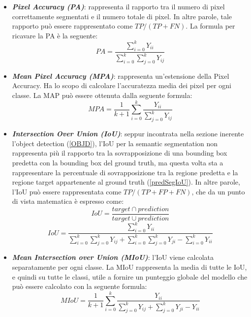 \begin{itemize}
    \item {\bfseries{\emph{Pixel Accuracy (PA)}}}: rappresenta il rapporto tra il numero di pixel 
    correttamente segmentati e il numero totale di pixel. In altre parole, tale 
    rapporto può essere rappresentato come $TP/(TP+FN)$. La formula per 
    ricavare la PA è la seguente:
    \begin{equation}
        PA = \frac{\sum_{i=0}^kY_{ii}}{\sum_{i=0}^k\sum_{j=0}^kY_{ij}}
    \end{equation}

    \item {\bfseries{\emph{Mean Pixel Accuracy (MPA)}}}: rappresenta un’estensione della Pixel 
    Accuracy. Ha lo scopo di calcolare l’accuratezza media dei pixel per ogni 
    classe. La MAP può essere ottenuta dalla seguente formula:
    \begin{equation}
        MPA = \frac{1}{k+1}\sum_{i=0}^k\frac{Y_{ii}}{\sum_{j=0}^kY_{ij}}
    \end{equation}

    \item {\bfseries{\emph{Intersection Over Union (IoU)}}}: seppur incontrata nella sezione inerente 
    l’object detection (\ref{OBJD}), l’IoU per la semantic segmentation non rappresenta 
    più il rapporto tra la sovrapposizione di una bounding box predetta con 
    la bounding box del ground truth, ma questa volta sta a rappresentare la 
    percentuale di sovrapposizione tra la regione predetta e la regione target 
    appartenente al ground truth (\ref{predSegIoU}). In altre parole, l’IoU può essere rappresentata 
    come $TP/(TP+FP+FN)$, che da un punto di vista matematica è espresso come:
    \begin{equation}\label{predSegIoU}
        IoU = \frac{target\cap prediction}{target\cup prediction}
    \end{equation}
    \begin{equation}
        IoU = \frac{\sum_{i=0}^kY_{ii}}{\sum_{i=0}^k\sum_{j=0}^kY_{ij}+\sum_{i=0}^k\sum_{j=0}^kY_{ji}-\sum_{i=0}^kY_{ii}}
    \end{equation}

    \item {\bfseries{\emph{Mean Intersection over Union (MIoU)}}}: l’IoU viene calcolata separatamente 
    per ogni classe. La MIoU rappresenta la media di tutte le IoU, e 
    quindi su tutte le classi, utile a fornire un punteggio globale del modello che 
    può essere calcolato con la seguente formula:
    \begin{equation}
        MIoU = \frac{1}{k+1}\sum_{i=0}^k\frac{Y_{ii}}{\sum_{j=0}^kY_{ij}+\sum_{j=0}^kY_{ji}-Y_{ii}}
    \end{equation}


\end{itemize}
